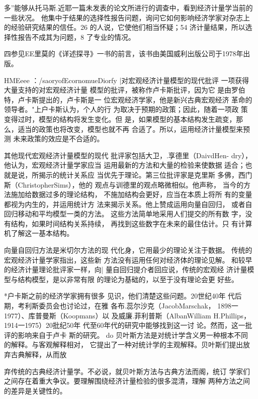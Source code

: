 多”能够从托马斯.近耶一篇未发表的论文所进行的调查中，看到经济计量学当前的一些状况。
他集中于结果的选择性报告问题，询问它如何影响经济学家对杂志上的经验研究结果的信任。26%
的人说，它使他们相当怀疑；54%
济计量结果，所以选择性报告不成其为问题，8%
了专业的情况。

四参见EE里莫的《详述探寻》一书的前言，该书由美国威利出版公司于1978年出版。

HMEeee
：/saoryofEcornomueDiorfy
|对宏观经济计量模型的现代批评
一项获得大量支持的对宏观经济计量
模型的批评，被称作卢卡斯批评，因为它
是由罗伯特，卢卡斯提出的，卢卡斯是一
位宏观经济学家，他是新兴古典宏观经济
革命的领导者。"上户卡斯认为，个人的行
为取决于预期的政策；因此，随着一项政
策变得过时，模型的结构将发生变化。但
是，如果模型的基本结构发生疏变，那
么，适当的政策也将改变，模型也就不再
合适了。所以，运用经济计量模型来预测
未来政策的效应是不合适的。

其他现代宏观经济计量模型的现代
批评家包括大卫，.享德里（DaivdHen-
dry），他认为，宏观经济计量学家应当
运用最新的方法和大量的检验来使数据
适合；也就是说，所揭示的统计关系应
当优先于理论。第三位批评家是克里斯
多佛，西门斯（ChristopherSims），他的
观点与训德里的观点略微相似。他声称，
当今的方法施加给数据过多的理论结构，
不施加结构会更好，应当在本质上将所
有的变量都视为内生的，并运用统计方
法来揭示关系。他上赞成运用向量自回归，
或者自回归移动和平均模型一类的方法。
这些方法简单地采用人们提交的所有数
字，没有结构，如果时间结构关系持续，
再找到这些数字在未来的最住估计。只
有计算机了解这一基本结构。

向量自回归方法是米切尔方法的现
代化身，它用最少的理论关注于数据。
传统的宏观经济计量学家指出，这些新
方法没有运用任何对经济体的理论见解。
和较早的经济计量理论批评家一样，向|
量自回归提介者回应说，传统的宏观经
济计量模型与结构模型，是以非常有限
的理论为基础的，以至于没有理论会更
好些。


*户卡斯之前的经济学家拥有很多
见识，他们清楚这些问题。20世纪40年
代后期，考利斯委员会也讨论过，在雅
各布.蕊尔沙克（JacobMarschak，
1898一1977）、库普曼斯（Koopmans）以
及威廉.菲利普斯（AlbanWilliam
H.Phillips，1914一1975）20批纪50年
代至60年代的研究中能够找到这一讨
论。然而，这一批评的影响来自于卢卡
斯的研究。
do
贝叶斯方法是对统计学含义男一种根本不同的解释。与客观解释相对，
它提出了一种对统计学的主观解释。贝叶斯们提出放弃古典解释，从而放

弃传统的古典经济计量学。不必说，就贝叶斯方法与古典方法而阁，统订
学家们之间存在着重大争议。要理解围绕经济计量检验的很多混清，理解
两种方法之间的差异是关键性的。

